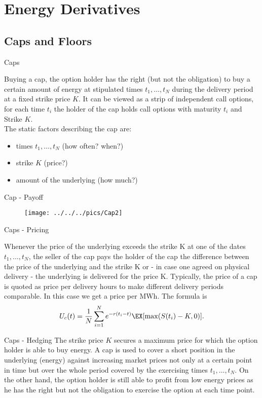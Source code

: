 \section{Energy Derivatives}
\subsection{Caps and  Floors}

{Caps}

Buying a cap, the option holder has the right (but not the
obligation) to buy a certain amount of energy at stipulated times
$t_1,\ldots,t_N$ during the delivery period at a fixed strike
price $K$. It can be viewed as a strip of
independent call options, for each time $t_i$ the holder of the cap holds call options with maturity $t_i$ and Strike $K$. \\
The static factors describing the cap are:
\begin{itemize}
\item times $t_1,\ldots,t_N$ (how often? when?)
\item strike $K$ (price?)
\item amount of the underlying (how much?)
\end{itemize}




{Cap - Payoff}
\begin{figure}
	\centering
		\texttt{[image: ../../../pics/Cap2]}
	\label{fig:Cap2}
\end{figure}



{Caps - Pricing}

Whenever the price of the underlying exceeds the strike K at one of the dates $t_1,\ldots,t_N$, the seller of the cap pays the holder of the cap the difference between the price of the underlying and the strike K or - in case one agreed on physical delivery - the underlying is delivered for the price K.
Typically, the price of a cap is quoted as price per delivery hours to make
different delivery periods comparable. In this case we get a price
per MWh. The formula is
$$U_c(t)=\frac{1}{N}\sum_{i=1}^Ne^{-r(t_i-t)}\EX[\max(S(t_i)-K,0)].$$



{Caps - Hedging}
The strike price $K$ secures a maximum price for which the option holder is able to buy energy. A cap is used to cover a short position in the underlying (energy) against
increasing market prices not only at a certain point in time but over the whole period covered by the exercising times $t_1,\ldots,t_N$.
On the other hand, the option holder is still able to profit from low energy prices as he has the right but not the obligation to exercise the option at each time point.



